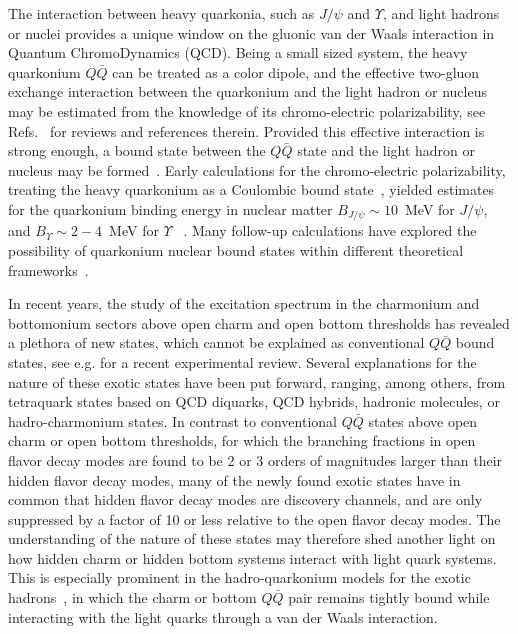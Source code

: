 \documentclass[prd,amsmath,%
twocolumn,floatfix,amssymb, preprintnumbers, linenumbers,nofootinbib, superscriptaddress]{revtex4}
\begin{document}
The interaction between heavy quarkonia, such as $J/\psi$ and $\Upsilon$, and light hadrons or nuclei provides a unique window on the gluonic van der Waals interaction in Quantum ChromoDynamics (QCD). Being a small sized system, the heavy quarkonium $Q \bar Q$ can be treated as a color dipole, and the effective two-gluon exchange interaction between the quarkonium and the light hadron  or nucleus may be estimated from the knowledge of its chromo-electric polarizability, see 
Refs.~\cite{Kharzeev:1995ij,Voloshin:2007dx,Hosaka:2016ypm} for reviews and references therein. 
Provided this effective interaction is strong enough, 
a bound state between the
$Q \bar Q$ state and the light hadron or  nucleus may be formed~\cite{Brodsky:1989jd, Wasson:1991fb, Luke:1992tm}. 
Early calculations for the chromo-electric polarizability,  treating the heavy quarkonium as a Coulombic bound state~\cite{Peskin:1979va,Bhanot:1979vb}, 
yielded estimates for the quarkonium binding energy in 
nuclear matter $B_{J/\psi} \sim 10$~MeV for $J/\psi$, and $B_{\Upsilon} \sim 2 - 4$~MeV for $\Upsilon$ ~\cite{Luke:1992tm}. Many follow-up calculations have explored the possibility of quarkonium nuclear bound states within different theoretical  frameworks~\cite{Brodsky:1997gh, Ko:2000jx, Tsushima:2011kh, Yokota:2013sfa, Beane:2014sda, Krein:2019gcm}. 

In recent years, the study of the excitation spectrum in the charmonium and bottomonium sectors above open charm and  open bottom thresholds has revealed a plethora of new  states, which cannot be explained as conventional $Q \bar Q$ bound states, see e.g. \cite{Olsen:2017bmm} for a recent experimental review. Several explanations for the nature of these exotic states have been put forward, ranging, among others, from tetraquark states based on QCD diquarks, QCD hybrids, hadronic molecules, or hadro-charmonium states. In contrast to conventional $Q \bar Q$ states above open charm or open bottom thresholds, for which the branching fractions in open flavor decay modes are found to be 2 or 3 orders of magnitudes larger than their hidden flavor decay modes, many of the newly found exotic states have in common that hidden flavor decay modes are discovery channels, and are only suppressed by a factor of 10 or less relative to the open flavor 
decay modes. The understanding of the nature of these states may therefore shed another light on how hidden charm or hidden bottom systems interact with light quark systems. This is especially prominent in the hadro-quarkonium models for the exotic hadrons~\cite{Dubynskiy:2008mq}, in which 
the charm or bottom $Q \bar Q$ pair remains tightly bound while interacting with the light quarks through a van der Waals interaction.
\end{document}
